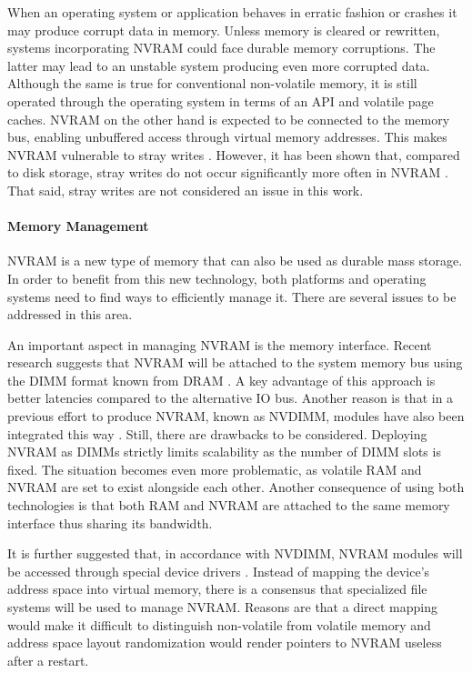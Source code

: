 When an operating system or application behaves in erratic fashion or crashes it
may produce corrupt data in memory. Unless memory is cleared or rewritten,
systems incorporating NVRAM could face durable memory corruptions. The latter
may lead to an unstable system producing even more corrupted data. Although the
same is true for conventional non-volatile memory, it is still operated through
the operating system in terms of an API and volatile page caches. NVRAM on the
other hand is expected to be connected to the memory bus, enabling unbuffered
access through virtual memory addresses. This makes NVRAM vulnerable to stray
writes \cite{condit2009better, venkataraman2011consistent}. However, it has been
shown that, compared to disk storage, stray writes do not occur significantly
more often in NVRAM \cite{chen1996rio}. That said, stray writes are not considered an issue in this work.

\paragraph{Memory Management}

NVRAM is a new type of memory that can also be used as durable mass storage. In
order to benefit from this new technology, both platforms and operating systems
need to find ways to efficiently manage it. There are several issues to be
addressed in this area.


An important aspect in managing NVRAM is the memory interface. Recent research
suggests that NVRAM will be attached to the system memory bus using the DIMM
format known from DRAM \cite{volos2017whisper, oukid2017data, andrei2017sap,
intel2017nvdimm}. A key advantage of this approach is better latencies compared
to the alternative IO bus. Another reason is that in a previous effort to
produce NVRAM, known as NVDIMM, modules have also been integrated this way
\cite{dulloor2014system, huang2014design}. Still, there are drawbacks to be
considered. Deploying NVRAM as DIMMs strictly limits scalability as the number
of DIMM slots is fixed. The situation becomes even more problematic, as volatile
RAM and NVRAM are set to exist alongside each other. Another consequence of
using both technologies is that both RAM and NVRAM are attached to the same
memory interface thus sharing its bandwidth.

It is further suggested that, in accordance with NVDIMM, NVRAM modules will be
accessed through special device drivers \cite{oukid2017data, intel2017nvdimm}.
Instead of mapping the device's address space into virtual memory, there is a
consensus that specialized file systems will be used to manage NVRAM. Reasons
are that a direct mapping would make it difficult to distinguish non-volatile
from volatile memory and address space layout randomization would render
pointers to NVRAM useless after a restart.

